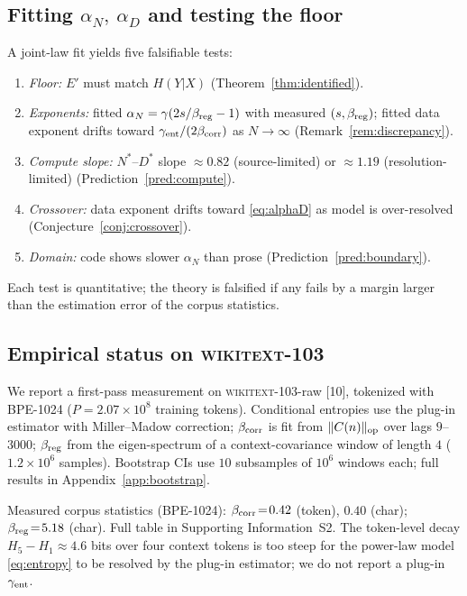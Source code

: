 \documentclass[12pt]{article}
\theoremstyle{remark}
\begin{document}
\subsection{Fitting $\alpha_N,\ \alpha_D$ and testing the floor}
A joint-law fit yields five falsifiable tests:
\begin{enumerate}[label=\textbf{(\arabic*)}]
\item \emph{Floor:} $E'$ must match $H(Y|X)$ (Theorem~\ref{thm:identified}).
\item \emph{Exponents:} fitted $\alpha_N=\gamma(2s/\beta_{\rm reg}-1)$ with
  measured $(s,\beta_{\rm reg})$; fitted data exponent drifts toward
  $\gamma_{\rm ent}/(2\beta_{\rm corr})$ as $N\!\to\!\infty$
  (Remark~\ref{rem:discrepancy}).
\item \emph{Compute slope:} $N^*$--$D^*$ slope $\approx0.82$
  (source-limited) or $\approx1.19$ (resolution-limited)
  (Prediction~\ref{pred:compute}).
\item \emph{Crossover:} data exponent drifts toward \eqref{eq:alphaD} as
  model is over-resolved (Conjecture~\ref{conj:crossover}).
\item \emph{Domain:} code shows slower $\alpha_N$ than prose
  (Prediction~\ref{pred:boundary}).
\end{enumerate}
Each test is quantitative; the theory is falsified if any fails by a
margin larger than the estimation error of the corpus statistics.

\subsection{Empirical status on \textsc{wikitext}-103}
\label{sec:empirical}

We report a first-pass measurement on \textsc{wikitext}-103-raw
[10], tokenized with BPE-1024 ($P=2.07\times10^8$ training
tokens). Conditional entropies use the plug-in estimator with Miller--Madow
correction; $\beta_{\rm corr}$ is fit from $\|C(n)\|_{\rm op}$ over lags
$9$--$3000$; $\beta_{\rm reg}$ from the eigen-spectrum of a context-covariance
window of length $4$ ($1.2\times10^6$ samples). Bootstrap CIs use $10$
subsamples of $10^6$ windows each; full results in
Appendix~\ref{app:bootstrap}.

Measured corpus statistics (BPE-1024):
$\beta_{\rm corr}\!=\!0.42$ (token), $0.40$ (char);
$\beta_{\rm reg}\!=\!5.18$ (char).  Full table in Supporting Information~S2.
The token-level decay $H_5-H_1\!\approx\!4.6$ bits over four context tokens is
too steep for the power-law model \eqref{eq:entropy} to be resolved by the
plug-in estimator; we do not report a plug-in $\gamma_{\rm ent}$.
\end{document}
